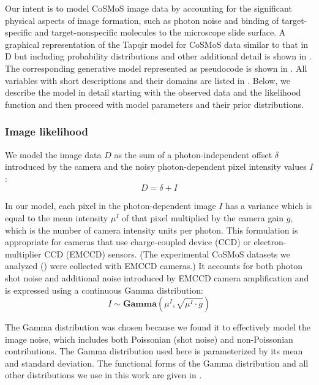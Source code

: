Our intent is to model CoSMoS image data by accounting for the significant physical aspects of image formation, such as photon noise and binding of target-specific and target-nonspecific molecules to the microscope slide surface. A graphical representation of the Tapqir model for CoSMoS data similar to that in D but including probability distributions and other additional detail is shown in . The corresponding generative model represented as pseudocode is shown in . All variables with short descriptions and their domains are listed in . Below, we describe the model in detail starting with the observed data and the likelihood function and then proceed with model parameters and their prior distributions.

\subsubsection{Image likelihood}

We model the image data $D$ as the sum of a photon-independent offset $\delta$ introduced by the camera and the noisy photon-dependent pixel intensity values $I$:
%
\begin{equation}
    D = \delta + I
\end{equation}

In our model, each pixel in the photon-dependent image $I$ has a  variance which is equal to  the mean intensity $\mu^I$ of that pixel multiplied by the camera gain $g$, which is the number of camera intensity units per photon. This formulation is appropriate for cameras that use charge-coupled device (CCD) or electron-multiplier CCD (EMCCD) sensors.  (The experimental CoSMoS datasets we analyzed () were collected with EMCCD cameras.)  It accounts for both photon shot noise and additional noise introduced by EMCCD camera amplification \citep{Van_Vliet1998-jk} and is expressed using a continuous Gamma distribution:
%
\begin{equation}
    I \sim \mathbf{Gamma} (\mu^I, \sqrt{\mu^I \cdot g})
\end{equation}

The Gamma distribution was chosen because we found it to effectively model the image noise, which includes both Poissonian (shot noise) and non-Poissonian contributions. The Gamma distribution used here is parameterized by its mean and standard deviation. The functional forms of the Gamma distribution and all other distributions we use in this work are given in .

